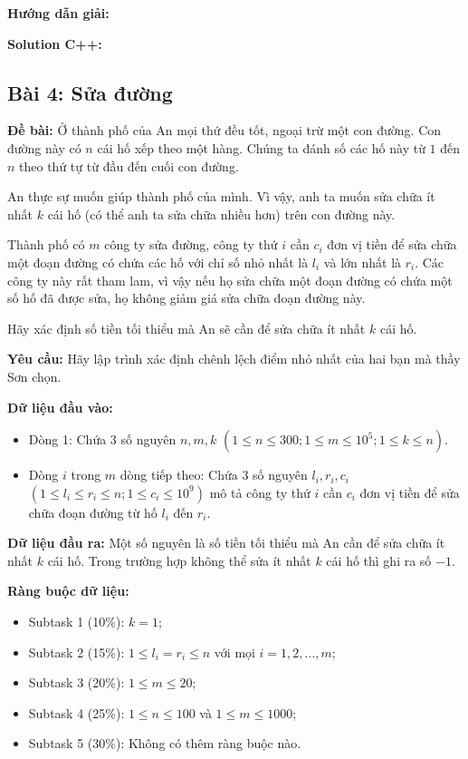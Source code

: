 \documentclass[12pt]{scrartcl}  %
\begin{document}
\textbf{Hướng dẫn giải:}

\textbf{Solution C++:}

\subsection{Bài 4: Sửa đường}

\textbf{Đề bài:}
Ở thành phố của An mọi thứ đều tốt, ngoại trừ một con đường. Con đường này có $n$ cái hố xếp theo một hàng. Chúng ta đánh số các hố này từ $1$ đến $n$ theo thứ tự từ đầu đến cuối con đường.

An thực sự muốn giúp thành phố của mình. Vì vậy, anh ta muốn sửa chữa ít nhất $k$ cái hố (có thể anh ta sửa chữa nhiều hơn) trên con đường này.

Thành phố có $m$ công ty sửa đường, công ty thứ $i$ cần $c_i$ đơn vị tiền để sửa chữa một đoạn đường có chứa các hố với chỉ số nhỏ nhất là $l_i$ và lớn nhất là $r_i$. Các công ty này rất tham lam, vì vậy nếu họ sửa chữa một đoạn đường có chứa một số hố đã được sửa, họ không giảm giá sửa chữa đoạn đường này.

Hãy xác định số tiền tối thiểu mà An sẽ cần để sửa chữa ít nhất $k$ cái hố.

\textbf{Yêu cầu:}
Hãy lập trình xác định chênh lệch điểm nhỏ nhất của hai bạn mà thầy Sơn chọn.

\textbf{Dữ liệu đầu vào:}
\begin{itemize}
    \item Dòng 1: Chứa $3$ số nguyên $n, m, k$ $(1 \leq n \leq 300; 1 \leq m \leq 10^5; 1 \leq k \leq n)$.
    \item Dòng $i$ trong $m$ dòng tiếp theo: Chứa $3$ số nguyên $l_i, r_i, c_i$ $(1 \leq l_i \leq r_i \leq n; 1 \leq c_i \leq 10^9)$ mô tả công ty thứ $i$ cần $c_i$ đơn vị tiền để sửa chữa đoạn đường từ hố $l_i$ đến $r_i$.
\end{itemize}

\textbf{Dữ liệu đầu ra:}
Một số nguyên là số tiền tối thiểu mà An cần để sửa chữa ít nhất $k$ cái hố. Trong trường hợp không thể sửa ít nhất $k$ cái hố thì ghi ra số $-1$.

\textbf{Ràng buộc dữ liệu:}
\begin{itemize}
    \item Subtask 1 (10\%): $k = 1$;
    \item Subtask 2 (15\%): $1 \leq l_i = r_i \leq n$ với mọi $i = 1, 2, ..., m$;
    \item Subtask 3 (20\%): $1 \leq m \leq 20$;
    \item Subtask 4 (25\%): $1 \leq n \leq 100$ và $1 \leq m \leq 1000$;
    \item Subtask 5 (30\%): Không có thêm ràng buộc nào.
\end{itemize}
\end{document}
